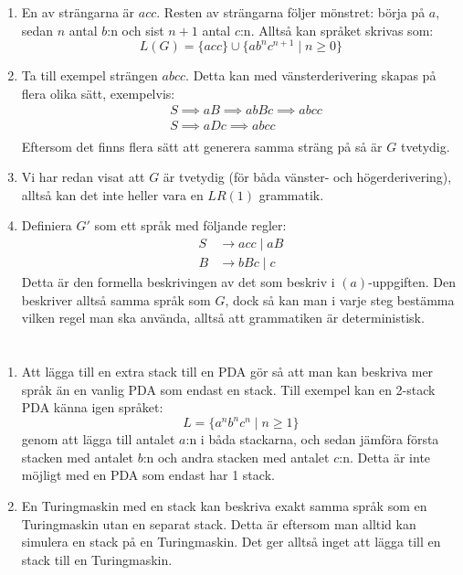 \documentclass{article}
\begin{document}
\begin{enumerate}[label=(\alph*)]
    \item 
        En av strängarna är $acc$. Resten av strängarna följer mönstret: börja på $a$, sedan $n$ antal $b$:n och sist $n+1$ antal $c$:n. Alltså kan språket skrivas som:
        $$L(G) =\{acc\} \cup \{ab^nc^{n+1} \mid n \ge 0 \}$$
    \item
        Ta till exempel strängen $abcc$. Detta kan med vänsterderivering skapas på flera olika sätt, exempelvis:
        \begin{align*}
        &S \implies aB  \implies abBc \implies abcc \\
        &S \implies aDc \implies abcc \\
        \end{align*}
        Eftersom det finns flera sätt att generera samma sträng på så är $G$ tvetydig.
        
    \item 
        Vi har redan visat att $G$ är tvetydig (för båda vänster- och högerderivering), alltså kan det inte heller vara en $LR(1)$ grammatik.
    \item
        Definiera $G'$ som ett språk med följande regler:
        \begin{align*}
            S & \to acc \mid aB \\
            B & \to bBc \mid c
        \end{align*}
        Detta är den formella beskrivingen av det som beskriv i $(a)$-uppgiften. Den beskriver alltså samma språk som $G$, dock så kan man i varje steg bestämma vilken regel man ska använda, alltså att grammatiken är deterministisk.

\end{enumerate}

\section{}

\begin{enumerate}[label=(\alph*)]
    \item Att lägga till en extra stack till en PDA gör så att man kan beskriva mer språk än en vanlig PDA som endast en stack. Till exempel kan en 2-stack PDA känna igen språket:
    $$L = \{a^nb^nc^n \mid n \ge 1 \}$$
    genom att lägga till antalet $a$:n i båda stackarna, och sedan jämföra första stacken med antalet $b$:n och andra stacken med antalet $c$:n.
    Detta är inte möjligt med en PDA som endast har 1 stack.
    
    \item En Turingmaskin med en stack kan beskriva exakt samma språk som en Turingmaskin utan en separat stack. Detta är eftersom man alltid kan simulera en stack på en Turingmaskin. Det ger alltså inget att lägga till en stack till en Turingmaskin.
\end{enumerate}
\end{document}
